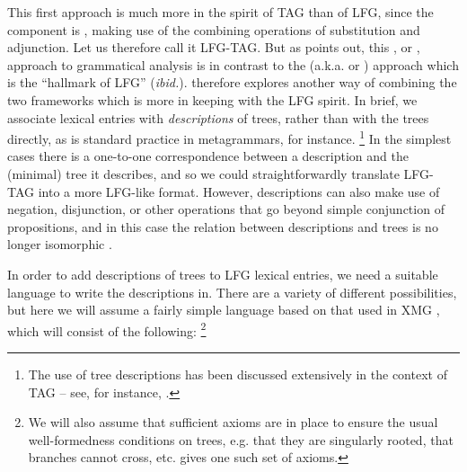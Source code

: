 \documentclass[output=paper,hidelinks]{langscibook}
\begin{document}
\begin{table}
{
    }
    \caption{Some elementary trees with associated LFG annotations}
    \label{tab:elementary-trees-tag-lfg}
\end{table}



This first approach is much more in the spirit of TAG than of LFG, since the
\cstruc{} component is , making use of the combining operations
of substitution and adjunction. Let us therefore call it LFG-TAG. But as
\citet[11]{kaplan1995formal} points out, this , or
, approach to grammatical analysis is in contrast to the
 (a.k.a.  or ) approach which is
the ``hallmark of LFG'' (\textit{ibid.}). \citet[ch.~5]{findlay2019} therefore
explores another way of combining the two frameworks which is more in keeping
with the LFG spirit. In brief, we associate lexical entries with
\emph{descriptions} of trees, rather than with the trees directly, as is
standard practice in metagrammars, for instance.%
%
\footnote{The use of tree descriptions has been discussed extensively in the
  context of TAG -- see, for instance,
  \citet{vijayshanker1992,Rogers:Vijay-Shanker:94,rambow:d-tree,rambow-etal2001,Kallmeyer:01}.}
%
In the simplest cases there is a one-to-one correspondence between a description
and the (minimal) tree it describes, and so we could straightforwardly translate
LFG-TAG into a more LFG-like format. However, descriptions can also make use of
negation, disjunction, or other operations that go beyond simple conjunction of
propositions, and in this case the relation between descriptions and trees is no
longer isomorphic \citep[14]{kaplan1995formal}.

In order to add descriptions of trees to LFG lexical entries, we need a suitable
language to write the descriptions in. There are a variety of different
possibilities, but here we will assume a fairly simple language based on that
used in XMG \citep[599]{crabbe:xmg}, which will consist of the following:%
%
\footnote{We will also assume that sufficient axioms are in place to ensure the
  usual well-formedness conditions on trees, e.g. that they are singularly
  rooted, that branches cannot cross, etc. \citet[15f.]{roge:98} gives one
  such set of axioms.}
%
\end{document}
